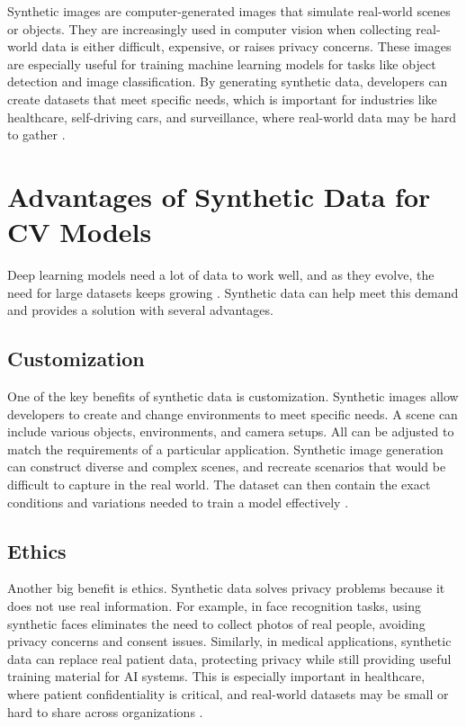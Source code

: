 Synthetic images are computer-generated images that simulate real-world scenes or objects. They are increasingly used in computer vision when collecting real-world data is either difficult, expensive, or raises privacy concerns. These images are especially useful for training machine learning models for tasks like object detection and image classification. By generating synthetic data, developers can create datasets that meet specific needs, which is important for industries like healthcare, self-driving cars, and surveillance, where real-world data may be hard to gather \cite{jimaging8110310}.

\section{Advantages of Synthetic Data for CV Models}

Deep learning models need a lot of data to work well, and as they evolve, the need for large datasets keeps growing \cite{10.1145/3042064, nikolenko2021synthetic}. Synthetic data can help meet this demand and provides a solution with several advantages.
 
\subsection{Customization}
One of the key benefits of synthetic data is customization. Synthetic images allow developers to create and change environments to meet specific needs. A scene can include various objects, environments, and camera setups. All can be adjusted to match the requirements of a particular application. Synthetic image generation can construct diverse and complex scenes, and recreate scenarios that would be difficult to capture in the real world. The dataset can then contain the exact conditions and variations needed to train a model effectively \cite{jimaging8110310, rajpura2017objectdetectionusingdeep}.

\subsection{Ethics}
Another big benefit is ethics. Synthetic data solves privacy problems because it does not use real information. For example, in face recognition tasks, using synthetic faces eliminates the need to collect photos of real people, avoiding privacy concerns and consent issues. Similarly, in medical applications, synthetic data can replace real patient data, protecting privacy while still providing useful training material for AI systems. This is especially important in healthcare, where patient confidentiality is critical, and real-world datasets may be small or hard to share across organizations \cite{jimaging8110310}.

